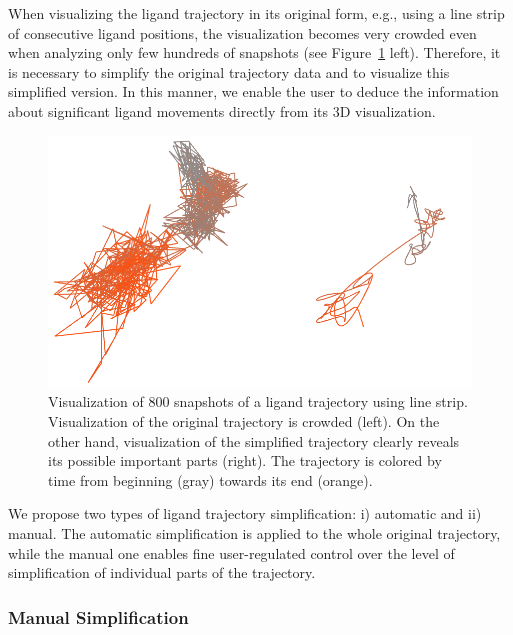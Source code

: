 When visualizing the ligand trajectory in its original form, e.g., using a line strip of consecutive ligand positions, the visualization becomes very crowded even when analyzing only few hundreds of snapshots (see Figure~\ref{fig:crowded} left).
Therefore, it is necessary to simplify the original trajectory data and to visualize this simplified version.
In this manner, we enable the user to deduce the information about significant ligand movements directly from its 3D visualization.

\begin{figure}
	\includegraphics[width=0.95\linewidth]{img/crowded-combined.png}
\caption{Visualization of 800 snapshots of a ligand trajectory using line strip.
Visualization of the original trajectory is crowded (left).
On the other hand, visualization of the simplified trajectory clearly reveals its possible important parts (right).
The trajectory is colored by time from beginning (gray) towards its end (orange).}
\label{fig:crowded}
\end{figure}

We propose two types of ligand trajectory simplification: i) automatic and ii) manual.
The automatic simplification is applied to the whole original trajectory, while the manual one enables fine user-regulated control over the level of simplification of individual parts of the trajectory.
\subsubsection*{Manual Simplification}

